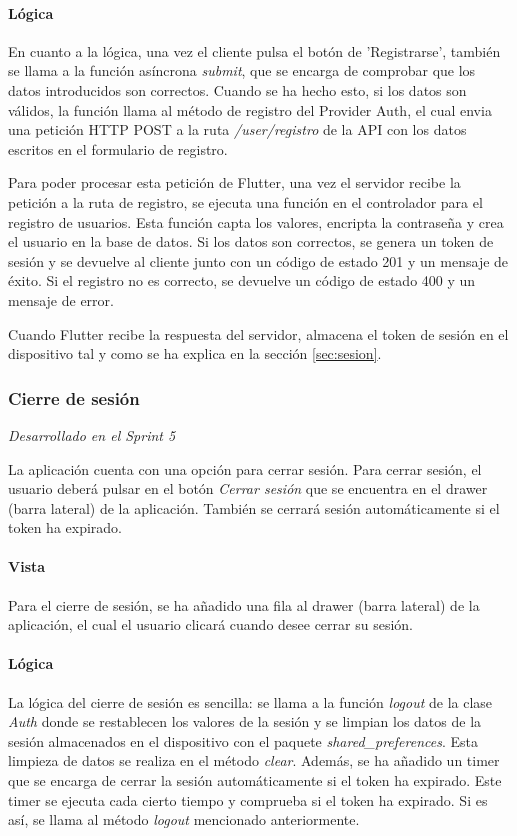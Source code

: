 \paragraph*{Lógica}
En cuanto a la lógica, una vez el cliente pulsa el botón de 'Registrarse', también se llama a la función asíncrona \textit{submit}, que se encarga de comprobar que los datos introducidos 
son correctos. Cuando se ha hecho esto, si los datos son válidos, la función llama al método de registro del Provider Auth, 
el cual envia una petición HTTP POST a la ruta \textit{/user/registro} de la API con los datos escritos en el formulario de registro. 

Para poder procesar esta petición de Flutter, una vez el servidor recibe la petición a la ruta de registro, se ejecuta una función en el controlador para el registro de usuarios.
 Esta función capta los valores, encripta la contraseña y crea el usuario en la base de datos. Si los datos son correctos, se genera un token de sesión y
  se devuelve al cliente junto con un código de estado 201 y un mensaje de éxito. Si el registro no es correcto, se devuelve un código de estado 400 y un mensaje de error.

  Cuando Flutter recibe la respuesta del servidor, almacena el token de sesión en el dispositivo tal y como se ha explica en la sección \ref{sec:sesion}.

\subsubsection{Cierre de sesión}
\textit{Desarrollado en el Sprint 5}
\label{sec:logout}

La aplicación cuenta con una opción para cerrar sesión. Para cerrar sesión, el usuario deberá pulsar en el botón \textit{Cerrar sesión}
 que se encuentra en el drawer (barra lateral) de la aplicación. También se cerrará sesión automáticamente si el token ha expirado.

\paragraph*{Vista}
Para el cierre de sesión, se ha añadido una fila al drawer (barra lateral) de la aplicación, el cual el usuario clicará cuando desee cerrar su sesión.

\paragraph*{Lógica}
La lógica del cierre de sesión es sencilla: se llama a la función \textit{logout} de la clase \textit{Auth} donde se restablecen 
los valores de la sesión y se limpian los datos de la sesión almacenados en el dispositivo con el paquete \textit{shared\_preferences}. 
Esta limpieza de datos se realiza en el método \textit{clear}.
Además, se ha añadido un timer que se encarga de cerrar la sesión automáticamente si el token ha expirado. Este timer se ejecuta 
cada cierto tiempo y comprueba si el token ha expirado. Si es así, se llama al método \textit{logout} mencionado anteriormente.

